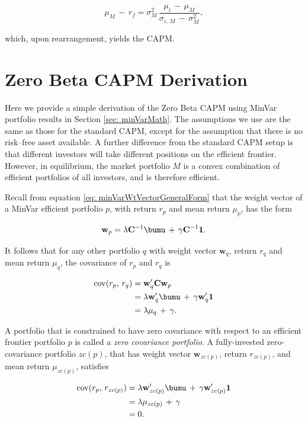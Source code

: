 \documentclass[graybox,envcountchap,sectrefs]{svmono}\usepackage[]{graphicx}\usepackage[]{xcolor}
\begin{document}
\begin{appendices}
\begin{equation}
\mu_{M}\,-\,r_{f}=\sigma_{M}^{2}\,\dfrac{\mu_{i}\,-\,\mu_{M}}{\sigma_{i,\,M}\,-\,\sigma_{M}^{2}},\label{eq: CAPMderivation}
\end{equation}

which, upon rearrangement, yields the CAPM.


\section{Zero Beta CAPM Derivation\label{sec: zeroBetaCAPMderivation}}

Here we provide a simple derivation of the Zero Beta CAPM using MinVar
portfolio results in Section \ref{sec: minVarMath}. The assumptions
we use are the same as those for the standard CAPM, except for the
assumption that there is no risk--free asset available. A further
difference from the standard CAPM setup is that different investors
will take different positions on the efficient frontier. However,
in equilibrium, the market portfolio $M$ is a convex combination
of efficient portfolios of all investors, and is therefore efficient.

Recall from equation \eqref{eq: minVarWtVectorGeneralForm} that the
weight vector of a MinVar efficient portfolio $p$, with return $r_{p}$
and mean return $\mu_{p}$, has the form

\[
\mathbf{w}_{p}=\lambda\mathbf{C}^{-1}\bumu\,+\,\gamma\mathbf{C}^{-1}\mathbf{1}.
\]

It follows that for any other portfolio $q$ with weight vector $\mathbf{w}_{q}$,
return $r_{q}$ and mean return $\mu_{q}$, the covariance of $r_{p}$
and $r_{q}$ is

\begin{align}
\mathrm{cov}(r_{p},\,r_{q}) & =\mathbf{w}_{q}^{\prime}\mathbf{C}\mathbf{w}_{p}\nonumber \\
 & =\lambda\mathbf{w}_{q}^{\prime}\bumu\,+\,\gamma\mathbf{w}_{q}^{\prime}\mathbf{1}\nonumber \\
 & =\lambda\mu_{q}\,+\,\gamma.\label{eq: cov(r_p,r_q)-initial}
\end{align}

A portfolio that is constrained to have zero covariance with respect
to an efficient frontier portfolio $p$ is called a \emph{zero covariance
portfolio}. A fully-invested zero-covariance portfolio $zc(p)$, that
has weight vector $\mathbf{w}_{zc(p)}$, return $r_{zc(p)}$, and
mean return $\mu_{zc(p)}$, satisfies

\begin{align}
\mathrm{cov}(r_{p},\,r_{zc(p)}) & =\lambda\mathbf{w}_{zc(p)}^{\prime}\bumu\,+\,\gamma\mathbf{w}_{zc(p)}^{\prime}\mathbf{1}\nonumber \\
 & =\lambda\mu_{zc(p)}\,+\,\gamma\nonumber \\
 & =0.\label{eq: cov(r_p,r_zc(p))}
\end{align}


\end{appendices}
\end{document}
